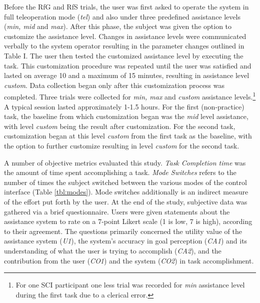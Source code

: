 \documentclass[letterpaper, 10 pt, journal, twoside]{IEEEtran}  %
\begin{document}
	Before the RfG and RfS trials, the user was first asked to operate the system in full teleoperation mode (\textit{tel}) and also under three predefined assistance levels (\textit{min, mid} and \textit{max}). After this phase, the subject was given the option to customize the assistance level. Changes in assistance levels were communicated verbally to the system operator resulting in the parameter changes outlined in Table I. The user then tested the customized assistance level by executing the task. This customization procedure was repeated until the user was satisfied and lasted on average 10 and a maximum of 15 minutes, resulting in assistance level \textit{custom}. Data collection began only after this customization process was completed. Three trials were collected for \textit{min, max} and \textit{custom} assistance levels.\footnote{For one SCI participant one less trial was recorded for \textit{min} assistance level during the first task due to a clerical error.} A typical session lasted approximately 1-1.5 hours. 
	For the first (non-practice) task, the baseline from which customization began was the \textit{mid} level assistance, with level \textit{custom} being the result after customization. For the second task, customization began at this level \textit{custom} from the first task as the baseline, with the option to further customize resulting in level \textit{custom} for the second task.
	
	 A number of objective metrics evaluated this study. \textit{Task Completion time} was the amount of time spent accomplishing a task. \textit{Mode Switches} refers to the number of times the subject switched between the various modes of the control interface (Table \ref{tbl:modes}). Mode switches additionally is an indirect measure of the effort put forth by the user. At the
	end of the study, subjective data was gathered via a brief
	questionnaire. Users were given
	statements about the assistance system to rate on a 7-point Likert scale (1 is low, 7 is high), according to
	their agreement. The questions primarily concerned the utility value of the assistance system (\textit{U1}), the system's accuracy in goal perception (\textit{CA1}) and its understanding of what the user is trying to accomplish (\textit{CA2}), and the contribution from the user (\textit{CO1}) and the system (\textit{CO2}) in task accomplishment.
	
\end{document}
